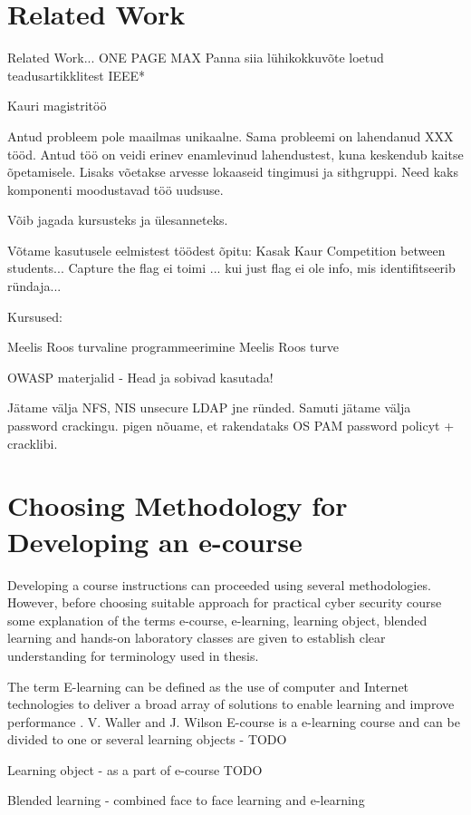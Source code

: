 \section{Related Work}
\label{Related Work}
Related Work...
ONE PAGE MAX
Panna siia lühikokkuvõte loetud teadusartikklitest IEEE*

Kauri magistritöö

Antud probleem pole maailmas unikaalne. Sama probleemi on lahendanud XXX tööd. Antud töö on veidi erinev enamlevinud lahendustest, kuna keskendub kaitse õpetamisele. Lisaks võetakse arvesse lokaaseid tingimusi ja sithgruppi. Need kaks komponenti moodustavad töö uudsuse.

Võib jagada kursusteks ja ülesanneteks.

Võtame kasutusele eelmistest töödest õpitu:
Kasak Kaur \citep{KasakKaur}
Competition between students...
Capture the flag ei toimi ... kui just flag ei ole info, mis identifitseerib ründaja...

Kursused:

Meelis Roos turvaline programmeerimine
Meelis Roos turve 

OWASP materjalid - Head ja sobivad kasutada!

Jätame välja NFS, NIS unsecure LDAP jne ründed.
Samuti jätame välja password crackingu. pigen nõuame, et rakendataks OS PAM password policyt + cracklibi.


\section{Choosing Methodology for Developing an e-course}

Developing a course instructions can proceeded using several methodologies. However, before choosing suitable approach for practical cyber security course some explanation of the terms e-course, e-learning, learning object, blended learning and hands-on laboratory classes are given to establish clear understanding for terminology used in thesis.

The term E-learning can be defined as the use of computer and Internet technologies to deliver a broad array of solutions to enable learning and improve performance \cite[p.~3]{food2011learning}.
V. Waller and J. Wilson 
E-course is a e-learning course and can be divided to one or several learning objects - {\color{red} TODO }

Learning object -  as a part of \gls{e-course} {\color{red} TODO }

Blended learning  - combined face to face learning and e-learning

